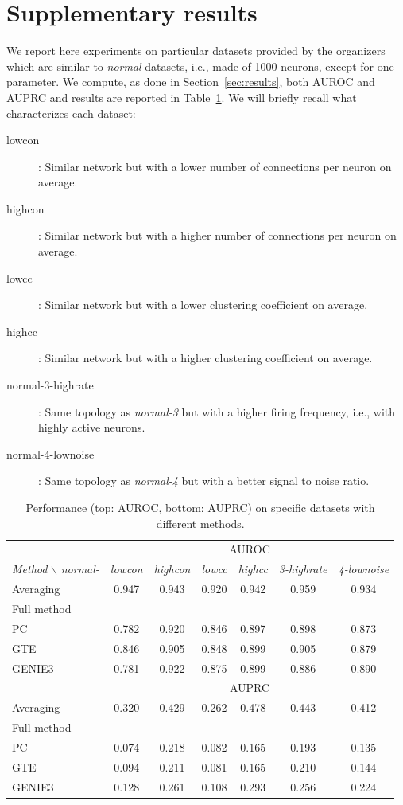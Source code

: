 \documentclass[wcp]{jmlr}
\begin{document}
\section{Supplementary results} \label{app:supp}

We report here experiments on particular datasets provided by the organizers
which are similar to \textit{normal} datasets, i.e., made of 1000 neurons,
except for one parameter. We compute, as done in Section~\ref{sec:results},
both AUROC and AUPRC and results are reported in
Table~\ref{tab:results_appendix}. We will briefly recall what characterizes
each dataset:
\begin{description}
\item[lowcon]: Similar network but with a lower number of connections per neuron on average.
\item[highcon]: Similar network but with a higher number of connections per neuron on average.
\item[lowcc]: Similar network but with a lower clustering coefficient on average.
\item[highcc]: Similar network but with a higher clustering coefficient on average.
\item[normal-3-highrate]: Same topology as \textit{normal-3} but with a higher firing frequency, i.e., with highly active neurons.
\item[normal-4-lownoise]: Same topology as \textit{normal-4} but with a better signal to noise ratio.
\end{description}

\begin{table}[h]
\centering
\small
\begin{tabular}{| l | c c c c c c |}
\hline
& \multicolumn{6}{c|}{AUROC}\\
\textit{Method} $\backslash$ \textit{normal-} & \textit{lowcon} & \textit{highcon} & \textit{lowcc} & \textit{highcc} & \textit{3-highrate} & \textit{4-lownoise} \\
\hline
\hline
Averaging     & 0.947 & 0.943 & 0.920 & 0.942 & 0.959 & 0.934 \\
Full method   &  &  &  & & &\\
PC & 0.782 & 0.920 &  0.846 & 0.897  & 0.898  & 0.873 \\
GTE & 0.846 & 0.905 & 0.848 & 0.899 & 0.905 & 0.879\\
GENIE3 & 0.781 &  0.922 & 0.875 & 0.899 & 0.886 &  0.890 \\ \hline
& \multicolumn{6}{c|}{AUPRC}\\ \hline
Averaging     & 0.320 & 0.429 & 0.262 & 0.478 & 0.443 & 0.412 \\
Full method   &  &  &  & & &\\
PC & 0.074 & 0.218 & 0.082 & 0.165  & 0.193 & 0.135 \\
GTE & 0.094 & 0.211 & 0.081 & 0.165 & 0.210 & 0.144\\
GENIE3 & 0.128 & 0.261 & 0.108 & 0.293 & 0.256 & 0.224\\ \hline
\end{tabular}
\caption{Performance (top: AUROC, bottom: AUPRC) on specific datasets with different methods.}
\label{tab:results_appendix}
\end{table}
\end{document}
